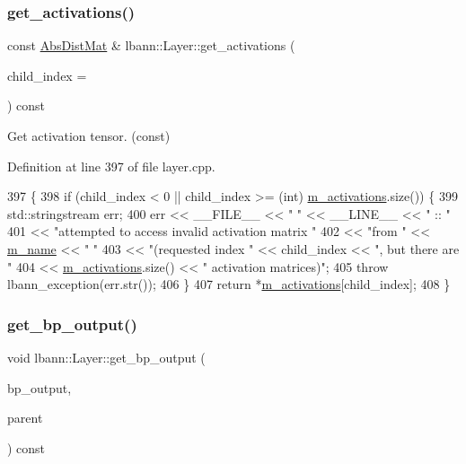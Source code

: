 \subsubsection{\texorpdfstring{get\+\_\+activations()}{get\_activations()}\hspace{0.1cm}{\footnotesize\ttfamily [2/2]}}
{\footnotesize\ttfamily const \hyperlink{base_8hpp_a9a697a504ae84010e7439ffec862b470}{Abs\+Dist\+Mat} \& lbann\+::\+Layer\+::get\+\_\+activations (\begin{DoxyParamCaption}\item[{int}]{child\+\_\+index = {} }\end{DoxyParamCaption}) const}

Get activation tensor. (const) 

Definition at line 397 of file layer.\+cpp.


\begin{DoxyCode}
397                                                               \{
398   \textcolor{keywordflow}{if} (child\_index < 0 || child\_index >= (\textcolor{keywordtype}{int}) \hyperlink{classlbann_1_1Layer_a7caf08e938141d1584e6939cefa4baed}{m\_activations}.size()) \{
399     std::stringstream err;
400     err << \_\_FILE\_\_ << \textcolor{stringliteral}{" "} << \_\_LINE\_\_ << \textcolor{stringliteral}{" :: "}
401         << \textcolor{stringliteral}{"attempted to access invalid activation matrix "}
402         << \textcolor{stringliteral}{"from "} << \hyperlink{classlbann_1_1Layer_aa47109ad09b399142fa92f9d3702189f}{m\_name} << \textcolor{stringliteral}{" "}
403         << \textcolor{stringliteral}{"(requested index "} << child\_index << \textcolor{stringliteral}{", but there are "}
404         << \hyperlink{classlbann_1_1Layer_a7caf08e938141d1584e6939cefa4baed}{m\_activations}.size() << \textcolor{stringliteral}{" activation matrices)"};
405     \textcolor{keywordflow}{throw} lbann\_exception(err.str());
406   \}
407   \textcolor{keywordflow}{return} *\hyperlink{classlbann_1_1Layer_a7caf08e938141d1584e6939cefa4baed}{m\_activations}[child\_index];
408 \}
\end{DoxyCode}
\mbox{\label{classlbann_1_1Layer_a81f9f4fc956daf4838a7ed248427b1f3}} 
\subsubsection{\texorpdfstring{get\+\_\+bp\+\_\+output()}{get\_bp\_output()}}
{\footnotesize\ttfamily void lbann\+::\+Layer\+::get\+\_\+bp\+\_\+output (\begin{DoxyParamCaption}\item[{\hyperlink{base_8hpp_a9a697a504ae84010e7439ffec862b470}{Abs\+Dist\+Mat} \&}]{bp\+\_\+output,  }\item[{const \hyperlink{classlbann_1_1Layer}{Layer} $\ast$}]{parent }\end{DoxyParamCaption}) const\hspace{0.3cm}{\ttfamily [virtual]}}

